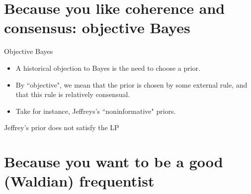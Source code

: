 \documentclass[10pt]{beamer}
\begin{document}

\section{Because you like coherence and consensus: objective Bayes}
\begin{frame}{Objective Bayes}
\begin{itemize}
\item A historical objection to Bayes is the need to choose a prior.
\item By ``objective", we mean that the prior is chosen by some external rule, and that this rule is relatively consensual.
\item Take for instance, Jeffreys's ``noninformative" priors.
\blank
\blank
\end{itemize}
\end{frame}
\begin{frame}{Jeffrey's prior does not satisfy the LP}
\end{frame}

\section{Because you want to be a good (Waldian) frequentist}
\end{document}
